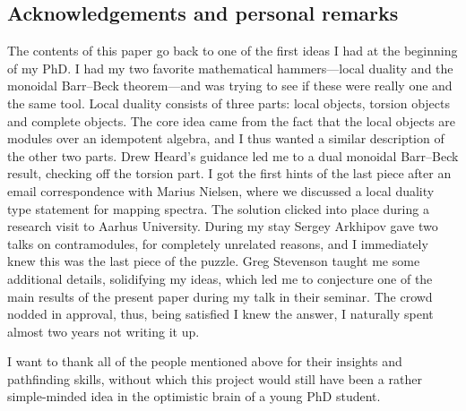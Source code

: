 


\subsection*{Acknowledgements and personal remarks}

The contents of this paper go back to one of the first ideas I had at the beginning of my PhD. I had my two favorite mathematical hammers---local duality and the monoidal Barr--Beck theorem---and was trying to see if these were really one and the same tool. Local duality consists of three parts: local objects, torsion objects and complete objects. The core idea came from the fact that the local objects are modules over an idempotent algebra, and I thus wanted a similar description of the other two parts. Drew Heard's guidance led me to a dual monoidal Barr--Beck result, checking off the torsion part. I got the first hints of the last piece after an email correspondence with Marius Nielsen, where we discussed a local duality type statement for mapping spectra. The solution clicked into place during a research visit to Aarhus University. During my stay Sergey Arkhipov gave two talks on contramodules, for completely unrelated reasons, and I immediately knew this was the last piece of the puzzle. Greg Stevenson taught me some additional details, solidifying my ideas, which led me to conjecture one of the main results of the present paper during my talk in their seminar. The crowd nodded in approval, thus, being satisfied I knew the answer, I naturally spent almost two years not writing it up. 

I want to thank all of the people mentioned above for their insights and pathfinding skills, without which this project would still have been a rather simple-minded idea in the optimistic brain of a young PhD student. 
